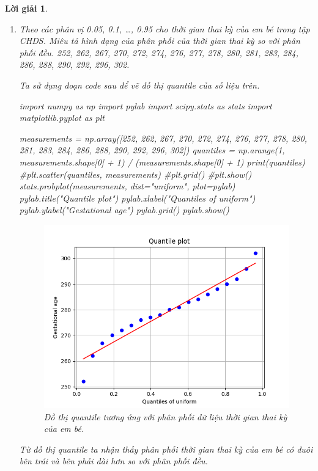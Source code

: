 \documentclass[14pt, a4paper]{article}
\theoremstyle{sltheorem}
\theoremstyle{soltheorem}
\newtheorem*{loigiai}{Lời giải}
\begin{document}
\begin{loigiai}
\begin{enumerate}[wide, labelwidth=!, labelindent=0pt,label=\textbf{\arabic*}.]
        \item Theo các phân vị 0.05, 0.1, \dots, 0.95 cho thời gian thai kỳ của em bé trong tập CHDS.
        Miêu tả hình dạng của phân phối của thời gian thai kỳ so với phân phối đều.
        252, 262, 267, 270, 272, 274, 276, 277, 278, 280, 281, 283, 284, 286, 288, 290, 292, 296, 302.
        
        Ta sử dụng đoạn code sau để vẽ đồ thị quantile của số liệu trên.

        \begin{python}
import numpy as np 
import pylab 
import scipy.stats as stats
import matplotlib.pyplot as plt
            
measurements = np.array([252, 262, 267, 270, 272, 274, 276, 277, 278, 280, 281, 283, 284, 286, 288, 290, 292, 296, 302])
quantiles = np.arange(1, measurements.shape[0] + 1) / (measurements.shape[0] + 1)
print(quantiles)
#plt.scatter(quantiles, measurements)
#plt.grid()
#plt.show()
stats.probplot(measurements, dist="uniform", plot=pylab)
pylab.title("Quantile plot")
pylab.xlabel("Quantiles of uniform")
pylab.ylabel("Gestational age")
pylab.grid()
pylab.show()
        \end{python}

        \begin{figure}[h!]
            \centering
            \includegraphics[scale=0.7]{5.png}
            \caption{Đồ thị quantile tương ứng với phân phối dữ liệu thời gian thai kỳ của em bé.}
        \end{figure}

        Từ đồ thị quantile ta nhận thấy phân phối thời gian thai kỳ của em bé có đuôi bên trái và bên phải dài hơn so với phân phối đều.


\end{enumerate}
\end{loigiai}
\end{document}
